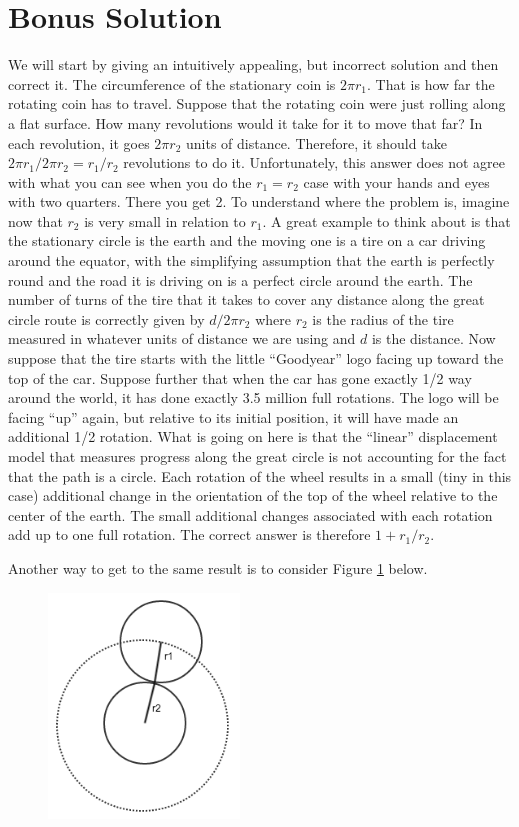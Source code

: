 \documentclass[11pt,a4paper]{report}
\theoremstyle{plain}
\theoremstyle{definition}
\theoremstyle{remark}
\begin{document}
\section*{Bonus Solution}
 We will start by giving an intuitively appealing, but incorrect solution and then correct it. The circumference of the stationary coin is $2{\pi}r_1$. That is how far the rotating coin has to travel.  Suppose that the rotating coin were just rolling along a flat surface.  How many revolutions would it take for it to move that far?  In each revolution, it goes $2{\pi}r_2$ units of distance.  Therefore, it should take $2{\pi}r_1 / 2{\pi}r_2 = r_1/r_2$ revolutions to do it. Unfortunately, this answer does not agree with what you can see when you do the $r_1 = r_2$ case with your hands and eyes with two quarters. There you get 2. To understand where the problem is, imagine now that $r_2$ is very small in relation to $r_1$.  A great example to think about is that the stationary circle is the earth and the moving one is a tire on a car driving around the equator, with the simplifying assumption that the earth is perfectly round and the road it is driving on is a perfect circle around the earth.  The number of turns of the tire that it takes to cover any distance along the great circle route is correctly given by $d/2{\pi}r_2$ where $r_2$ is the radius of the tire measured in whatever units of distance we are using and $d$ is the distance.  Now suppose that the tire starts with the little ``Goodyear'' logo facing up toward the top of the car.  Suppose further that when the car has gone exactly 1/2 way around the world, it has done exactly 3.5 million full rotations.  The logo will be facing ``up'' again, but relative to its initial position, it will have made an additional 1/2 rotation.  What is going on here is that the ``linear'' displacement model that measures progress along the great circle is not accounting for the fact that the path is a circle.  Each rotation of the wheel results in a small (tiny in this case) additional change in the orientation of the top of the wheel relative to the center of the earth. The small additional changes associated with each rotation add up to one full rotation.  The correct answer is therefore $1 + r_1/r_2$.

\newpage 
Another way to get to the same result is to consider Figure \ref{fig:quarters} below.

\begin{figure}[h!]
  \includegraphics[width=2in]{quarters.png}
  \caption{}
  \label{fig:quarters}
\end{figure}
\end{document}
